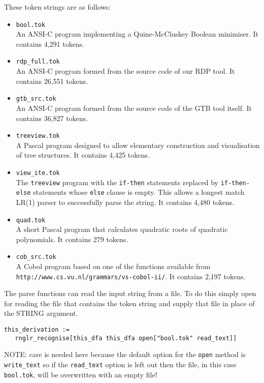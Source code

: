 These token strings are as follows:
\begin{itemize}
\item
\verb+bool.tok+\\ An ANSI-C program implementing a 
Quine-McCluskey Boolean minimiser.
It contains 4,291 tokens.

\item
\verb+rdp_full.tok+\\ An ANSI-C program formed from the source code of
our RDP tool.
It contains 26,551 tokens.

\item
\verb+gtb_src.tok+\\ An ANSI-C program formed from the source code of
the GTB tool itself.
It contains 36,827  tokens.

\item
\verb+treeview.tok+\\ A Pascal program designed to allow elementary
construction and visualisation of tree structures.
It contains 4,425  tokens.

\item
\verb+view_ite.tok+\\ The \verb+treeview+ program with the
\verb+if-then+ statements replaced by \verb+if-then-else+ statements
whose \verb+else+ clause is empty. This allows a longest match LR(1) 
parser to successfully parse the string.
It contains 4,480  tokens.

\item
\verb+quad.tok+\\ A short Pascal program that calculates quadratic roots
of quadratic polynomials.
It contains 279 tokens.

\item
\verb+cob_src.tok+\\ A Cobol program based on one of the functions
available from\\ 
{\texttt{http://www.cs.vu.nl/grammars/vs-cobol-ii/}}. 
It contains 2,197 tokens.
\end{itemize}

The \gtb parse functions can read the input string from a file. To do
this simply open for reading the file that contains the token string
and supply that file in place of the STRING argument.
\begin{verbatim}
this_derivation := 
   rnglr_recognise[this_dfa this_dfa open["bool.tok" read_text]]
\end{verbatim}
NOTE: care is needed here because the default option for the \verb+open+
method is \verb+write_text+ so if the \verb+read_text+ option is
left out then the file, in this case \verb+bool.tok+, will be
overwritten with an empty file!

